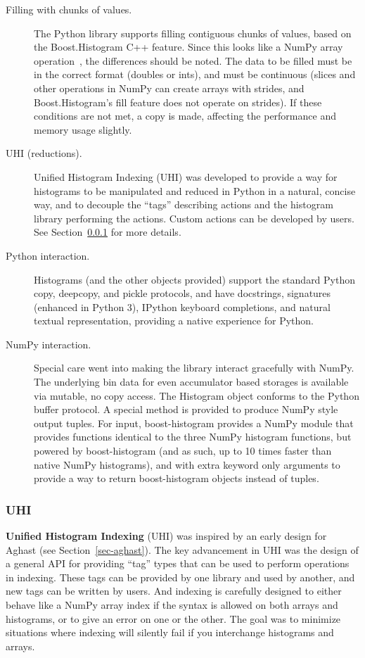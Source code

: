 \documentclass{webofc}
\begin{document}
\begin{description}
\item[Filling with chunks of values.] The Python library supports filling contiguous chunks of values, based on the Boost.Histogram C++ feature. Since this looks like a NumPy array operation~\cite{walt2011numpy}, the differences should be noted. The data to be filled must be in the correct format (doubles or ints), and must be continuous (slices and other operations in NumPy can create arrays with strides, and Boost.Histogram's fill feature does not operate on strides). If these conditions are not met, a copy is made, affecting the performance and memory usage slightly.
\item[UHI (reductions).] Unified Histogram Indexing (UHI) was developed to provide a way for histograms to be manipulated and reduced in Python in a natural, concise way, and to decouple the ``tags'' describing actions and the histogram library performing the actions. Custom actions can be developed by users. See Section~\ref{sec-bhp-uhi} for more details.
\item[Python interaction.] Histograms (and the other objects provided) support the standard Python copy, deepcopy, and pickle protocols, and have docstrings, signatures (enhanced in Python 3), IPython keyboard completions, and natural textual representation,  providing a native experience for Python.
\item[NumPy interaction.] Special care went into making the library interact gracefully with NumPy. The underlying bin data for even accumulator based storages is available via mutable, no copy access. The Histogram object conforms to the Python buffer protocol. A special method is provided to produce NumPy style output tuples. For input, boost-histogram provides a NumPy module that provides functions identical to the three NumPy histogram functions, but powered by boost-histogram (and as such, up to 10 times faster than native NumPy histograms), and with extra keyword only arguments to provide a way to return boost-histogram objects instead of tuples.

\end{description}


\subsubsection{UHI}
\label{sec-bhp-uhi}

\textbf{Unified Histogram Indexing} (UHI) was inspired by an early design for Aghast (see Section~\ref{sec-aghast}). The key advancement in UHI was the design of a general API for providing ``tag'' types that can be used to perform operations in indexing. These tags can be provided by one library and used by another, and new tags can be written by users. And indexing is carefully designed to either behave like a NumPy array index if the syntax is allowed on both arrays and histograms, or to give an error on one or the other. The goal was to minimize situations where indexing will silently fail if you interchange histograms and arrays.
\end{document}
